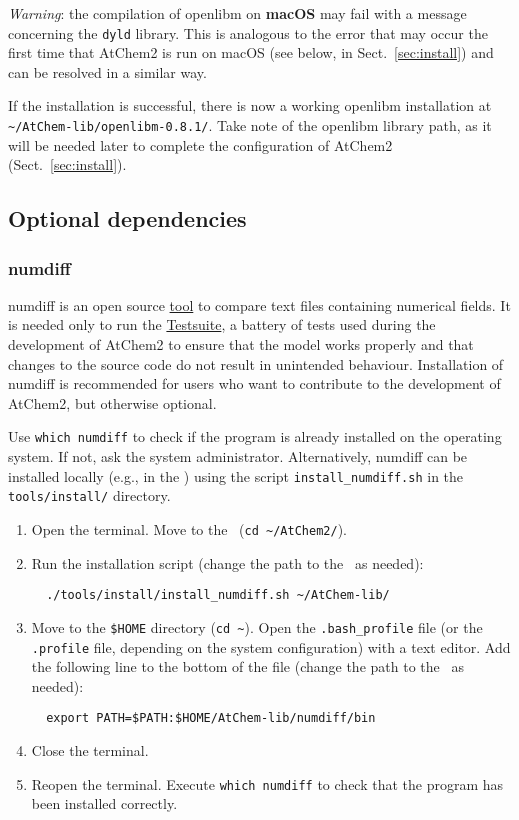 \emph{Warning}: the compilation of openlibm on \textbf{macOS} may fail
with a message concerning the \texttt{dyld} library. This is analogous
to the error that may occur the first time that AtChem2 is run on
macOS (see below, in Sect.~\ref{sec:install}) and can be resolved in a
similar way.

If the installation is successful, there is now a working openlibm
installation at \texttt{\textasciitilde/AtChem-lib/openlibm-0.8.1/}.
Take note of the openlibm library path, as it will be needed later to
complete the configuration of AtChem2 (Sect.~\ref{sec:install}).

\subsection{Optional dependencies} \label{subsec:optional-dependencies}

\subsubsection{numdiff}

numdiff is an open source \href{https://www.nongnu.org/numdiff}{tool}
to compare text files containing numerical fields. It is needed only
to run the \hyperref[sec:test-suite]{Testsuite}, a battery of tests
used during the development of AtChem2 to ensure that the model works
properly and that changes to the source code do not result in
unintended behaviour. Installation of numdiff is recommended for users
who want to contribute to the development of AtChem2, but otherwise
optional.

Use \verb|which numdiff| to check if the program is already installed
on the operating system. If not, ask the system administrator.
Alternatively, numdiff can be installed locally (e.g., in the \depdir)
using the script \texttt{install\_numdiff.sh} in the
\texttt{tools/install/} directory.

\begin{enumerate}
\item Open the terminal. Move to the \maindir\ (\verb|cd ~/AtChem2/|).
\item Run the installation script (change the path to the \depdir\ as
  needed):
  \begin{verbatim}
  ./tools/install/install_numdiff.sh ~/AtChem-lib/
  \end{verbatim}
\item Move to the \texttt{\$HOME} directory (\texttt{cd\ \textasciitilde}).
  Open the \texttt{.bash\_profile} file (or the \texttt{.profile}
  file, depending on the system configuration) with a text editor. Add the
  following line to the bottom of the file (change the path to the
  \depdir\ as needed):
  \begin{verbatim}
  export PATH=$PATH:$HOME/AtChem-lib/numdiff/bin
  \end{verbatim}
\item Close the terminal.
\item Reopen the terminal. Execute \verb|which numdiff| to check that
  the program has been installed correctly.
\end{enumerate}

